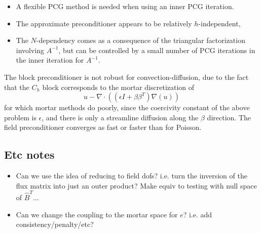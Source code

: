 \documentclass{article}
\newcommand{\grad}{\nabla}
\renewcommand{\div}{\grad \cdot}
\begin{document}
\begin{itemize}
\item A flexible PCG method is needed when using an inner PCG iteration.
\item The approximate preconditioner appears to be relatively $h$-independent, 
\item The $N$-dependency comes as a consequence of the triangular factorization involving $A^{-1}$, but can be controlled by a small number of PCG iterations in the inner iteration for $A^{-1}$.  
\end{itemize}
The block preconditioner is not robust for convection-diffusion, due to the fact that the $C_h$ block corresponds to the mortar discretization of 
\[
u - \div((\epsilon I + \beta\beta^T)\grad(u))
\]
for which mortar methods do poorly, since the coercivity constant of the above problem is $\epsilon$, and there is only a streamline diffusion along the $\beta$ direction.  The field preconditioner converges as fast or faster than for Poisson.  
\begin{figure}
\centering
{}
\end{figure}

\subsection{Etc notes}
\begin{itemize}
\item Can we use the idea of reducing to field dofs?  i.e. turn the inversion of the flux matrix into just an outer product?  Make equiv to testing with null space of $\hat{B}^T$...
\item Can we change the coupling to the mortar space for $e$?  i.e. add consistency/penalty/etc?
\end{itemize}
\end{document}
